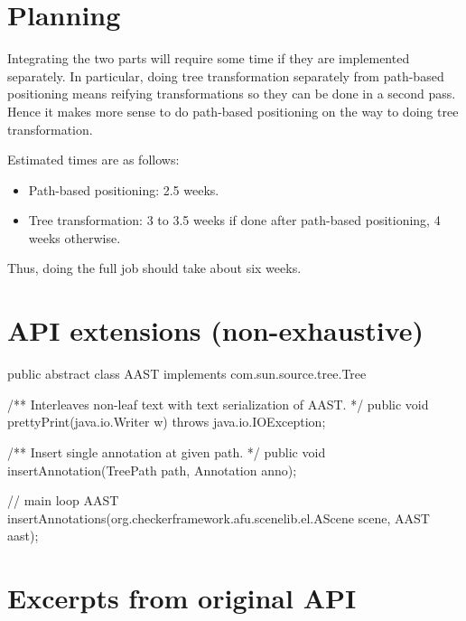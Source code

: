 \documentclass{article}
\newenvironment{jcode}{\footnotesize\verbatim}{\endverbatim\normalsize}
\begin{document}
\section{Planning}

Integrating the two parts will require some time if they are
implemented separately.  In particular, doing tree transformation
separately from path-based positioning means reifying transformations
so they can be done in a second pass.  Hence it makes more sense to
do path-based positioning on the way to doing tree transformation.

Estimated times are as follows:
\begin{itemize}
\item  Path-based positioning: 2.5 weeks.
\item  Tree transformation: 3 to 3.5 weeks if done after path-based
positioning, 4 weeks otherwise.
\end{itemize}
Thus, doing the full job should take about six weeks.

\appendix

\section{API extensions (non-exhaustive)}

\begin{jcode}
public abstract class AAST implements com.sun.source.tree.Tree {
  /** Interleaves non-leaf text with text serialization of AAST. */
  public void prettyPrint(java.io.Writer w) throws java.io.IOException;

  /** Insert single annotation at given path. */
  public void insertAnnotation(TreePath path, Annotation anno);
}

// main loop
AAST insertAnnotations(org.checkerframework.afu.scenelib.el.AScene scene, AAST aast);
\end{jcode}

\newpage
\section{Excerpts from original API}\label{sec:exc}
\end{document}

